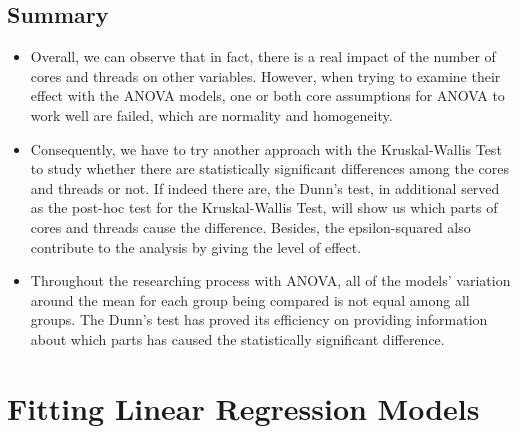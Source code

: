 \documentclass[a4paper]{article}
\begin{document}
\subsection{Summary}
\begin{itemize}
    \item[] Overall, we can observe that in fact, there is a real impact of the number of cores and threads on other variables. However, when trying to examine their effect with the ANOVA models, one or both core assumptions for ANOVA to work well are failed, which are normality and homogeneity.
    
    \item[] Consequently, we have to try another approach with the Kruskal-Wallis Test to study whether there are statistically significant differences among the cores and threads or not. If indeed there are, the Dunn's test, in additional served as the post-hoc test for the Kruskal-Wallis Test, will show us which parts of cores and threads cause the difference. Besides, the epsilon-squared also contribute to the analysis by giving the level of effect.
    
    \item[] Throughout the researching process with ANOVA, all of the models' variation around the mean for each group being compared is not equal among all groups. The Dunn's test has proved its efficiency on providing information about which parts has caused the statistically significant difference.  
\end{itemize}

\section{Fitting Linear Regression Models}
\end{document}
